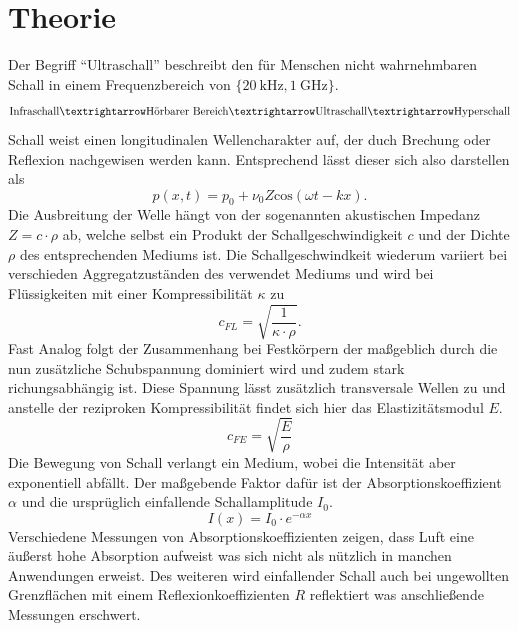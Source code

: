 \section{Theorie}
Der Begriff \enquote{Ultraschall} beschreibt den für Menschen nicht wahrnehmbaren Schall in einem Frequenzbereich von $\{\SI{20}{\kilo\hertz},\SI{1}{\giga\hertz}\}$.
\begin{align*}
    \text{Infraschall}  \textrightarrow \text{Hörbarer Bereich}  \textrightarrow \text{Ultraschall}  \textrightarrow \text{Hyperschall} 
\end{align*} 
Schall weist einen longitudinalen Wellencharakter auf, der duch Brechung oder Reflexion nachgewisen werden kann. Entsprechend lässt dieser sich also darstellen als
\begin{equation*}
    p(x,t) =  p_0 + \nu_0 Z \text{cos} (\omega t - kx).
\end{equation*}
Die Ausbreitung der Welle hängt von der sogenannten akustischen Impedanz $Z=c\cdot\rho$ ab, welche selbst ein Produkt der
Schallgeschwindigkeit $c$ und der Dichte $\rho$ des entsprechenden Mediums ist. Die Schallgeschwindkeit wiederum variiert bei verschieden Aggregatzuständen des verwendet Mediums
und wird bei Flüssigkeiten mit einer Kompressibilität $\kappa$ zu
\begin{equation*}
    c_{FL}=\sqrt{\frac{1}{\kappa \cdot \rho}}.
\end{equation*}
Fast Analog folgt der Zusammenhang bei Festkörpern der maßgeblich durch die nun zusätzliche Schubspannung dominiert wird und zudem stark richungsabhängig ist.
Diese Spannung lässt zusätzlich transversale Wellen zu und anstelle der reziproken Kompressibilität findet sich hier das Elastizitätsmodul $E$.
\begin{equation*}
    c_{FE}=\sqrt{\frac{E}{\rho}}
\end{equation*}
Die Bewegung von Schall verlangt ein Medium, wobei die Intensität aber exponentiell abfällt.
Der maßgebende Faktor dafür ist der Absorptionskoeffizient $\alpha$ und die ursprüglich einfallende Schallamplitude $I_0$.
\begin{equation}
    \label{eq:dummsumm}
    I(x)=I_0 \cdot e^{-\alpha x}
\end{equation}
Verschiedene Messungen von Absorptionskoeffizienten %
zeigen, dass Luft eine äußerst hohe Absorption aufweist was sich nicht als nützlich in manchen Anwendungen erweist.
Des weiteren wird einfallender Schall auch bei ungewollten Grenzflächen mit einem Reflexionkoeffizienten $R$ reflektiert was anschließende Messungen erschwert.
